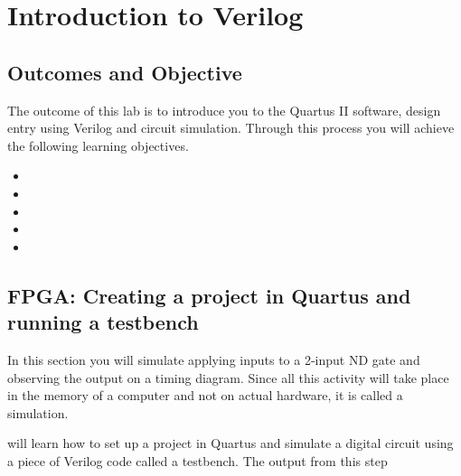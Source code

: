\chapter{Introduction to Verilog}
\label{introductionToVerilog}
\graphicspath{ {./Lab01SimpleVerilog/Fig} }


\section{Outcomes and Objective }

The outcome of this lab is to introduce you to the Quartus II
software, design entry using Verilog and circuit simulation.
Through this process you will achieve the following
learning objectives.
\begin{itemize}
	\itemsep=0em
	\item {}
	\item {}
	\item {}
	\item {}
	\item{}
\end{itemize}

\section{FPGA: Creating a project in Quartus and running a testbench}
In this section you will simulate applying inputs to a 2-input ND gate and
observing the output on a timing diagram.  Since all this activity will
take place in the memory of a computer and not on actual hardware,
it is called a simulation.

will learn how to set up a project in Quartus and simulate
a digital circuit using a piece of Verilog code called a testbench.  The output
from this step

